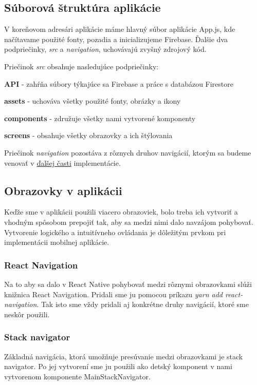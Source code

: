 \subsection{Súborová štruktúra aplikácie}
V koreňovom adresári aplikácie máme hlavný súbor aplikácie App.js, kde načítavame použité fonty, pozadia a inicializujeme Firebase. Ďalšie dva podpriečinky, \textit{src} a \textit{navigation}, uchovávajú zvyšný zdrojový kód. 

Priečinok \textit{src} obsahuje nasledujúce podpriečinky:
\begin{itemize}
\setlength\itemsep{0.1mm}
{\item \textbf{API} - zahŕňa súbory týkajúce sa Firebase a práce s databázou Firestore} 
{\item \textbf{assets} - uchováva všetky použité fonty, obrázky a ikony} 
{\item \textbf{components} - združuje všetky nami vytvorené komponenty} 
{\item \textbf{screens} - obsahuje všetky obrazovky a ich štýlovania}
\end{itemize}

Priečinok \textit{navigation} pozostáva z rôznych druhov navigácií, ktorým sa budeme venovať v \hyperref[sec:screens]{ďalšej časti} implementácie.

\subsection{Obrazovky v aplikácii}
\label{sec:screens}
Keďže sme v aplikácii použili viacero obrazoviek, bolo treba ich vytvoriť a vhodným spôsobom prepojiť tak, aby sa medzi nimi dalo navzájom pohybovať. Vytvorenie logického a intuitívneho ovládania je dôležitým prvkom pri implementácii mobilnej aplikácie.
\subsubsection{React Navigation}
Na to aby sa dalo v React Native pohybovať medzi rôznymi obrazovkami slúži knižnica React Navigation. Pridali sme ju pomocou príkazu \textit{yarn add react-navigation}. Tak isto sme vždy pridali aj konkrétne druhy navigácií, ktoré sme neskôr použili.
\subsubsection{Stack navigator}
Základná navigácia, ktorá umožňuje presúvanie medzi obrazovkami je stack navigator. Po jej vytvorení sme ju použili ako detský komponent v nami vytvorenom komponente MainStackNavigator. 

